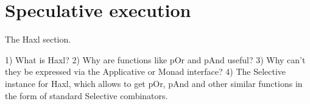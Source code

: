 \section{Speculative execution}\label{sec-haxl}

The Haxl section.

1) What is Haxl?
2) Why are functions like pOr and pAnd useful?
3) Why can't they be expressed via the Applicative or Monad interface?
4) The Selective instance for Haxl, which allows to get pOr, pAnd and other
similar functions in the form of standard Selective combinators.